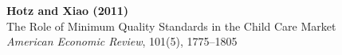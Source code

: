 \documentclass[12pt]{article}
\begin{document}
\begin{center}
{\Large\bfseries Hotz and Xiao (2011)}\\
{\large The Role of Minimum Quality Standards}
{\large in the Child Care Market}\\
\vspace{0.5em}
{\normalsize \textit{American Economic Review}, 101(5), 1775--1805}
\end{center}

\vspace{1em}




\end{document}

